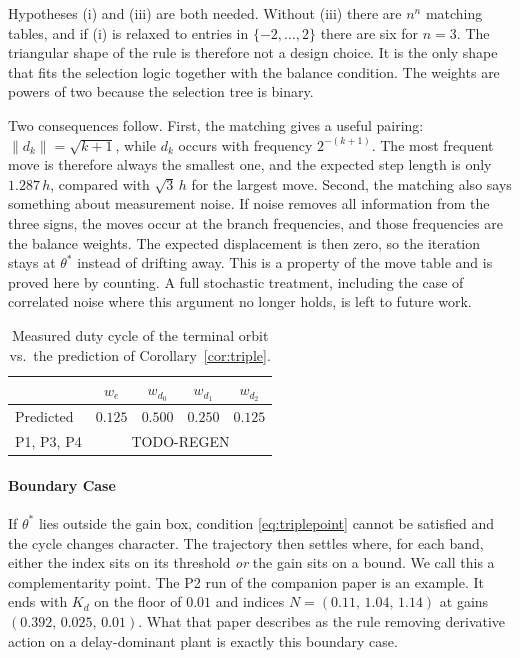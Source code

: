 \documentclass[letterpaper, 10pt, conference, twocolumn]{ieeeconf}
\begin{document}
Hypotheses (i) and (iii) are both needed. Without (iii) there are $n^n$
matching tables, and if (i) is relaxed to entries in $\{-2, \dots, 2\}$ there
are six for $n = 3$. The triangular shape of the rule is therefore not a design
choice. It is the only shape that fits the selection logic together with the
balance condition. The weights are powers of two because the selection tree is
binary.

Two consequences follow. First, the matching gives a useful pairing:
$\lVert d_k \rVert = \sqrt{k+1}$, while $d_k$ occurs with frequency
$2^{-(k+1)}$. The most frequent move is therefore always the smallest one, and
the expected step length is only $1.287\,h$, compared with $\sqrt{3}\,h$ for
the largest move. Second, the matching also says something about measurement
noise. If noise removes all information from the three signs, the moves occur
at the branch frequencies, and those frequencies are the balance weights. The
expected displacement is then zero, so the iteration stays at $\theta^*$
instead of drifting away. This is a property of the move table and is proved
here by counting. A full stochastic treatment, including the case of
correlated noise where this argument no longer holds, is left to future work.

\begin{table}[t]
\small
\centering
\caption{Measured duty cycle of the terminal orbit vs.\ the prediction of
Corollary~\ref{cor:triple}.
}
\label{tab:duty}
\begin{tabular}{lcccc}
\toprule
 & $w_e$ & $w_{d_0}$ & $w_{d_1}$ & $w_{d_2}$ \\
\midrule
Predicted & $0.125$ & $0.500$ & $0.250$ & $0.125$ \\
P1, P3, P4 & \multicolumn{4}{c}{TODO-REGEN} \\
\bottomrule
\end{tabular}
\end{table}

\paragraph{Boundary Case} If $\theta^*$ lies outside the gain box, condition
\eqref{eq:triplepoint} cannot be satisfied and the cycle changes character.
The trajectory then settles where, for each band, either the index sits on its
threshold \emph{or} the gain sits on a bound. We call this a complementarity
point. The P2 run of the companion paper is an example. It ends with $K_d$ on
the floor of $0.01$ and indices $N = (0.11,\, 1.04,\, 1.14)$ at gains
$(0.392,\, 0.025,\, 0.01)$. What that paper describes as the rule removing
derivative action on a delay-dominant plant is exactly this boundary case.
\end{document}

